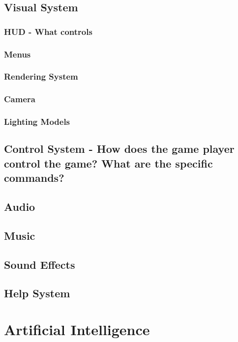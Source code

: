 \documentclass[article, 11pt]{article}
\begin{document}
\subsection{Visual System}
\label{sec:org64cfdb4}
\subsubsection{HUD - What controls}
\label{sec:org4060648}
\subsubsection{Menus}
\label{sec:org0fc22ea}
\subsubsection{Rendering System}
\label{sec:orga9f72cd}
\subsubsection{Camera}
\label{sec:orgdd8c7b1}
\subsubsection{Lighting Models}
\label{sec:orgc630454}
\subsection{Control System - How does the game player control the game? What are the specific commands?}
\label{sec:org1316122}
\subsection{Audio}
\label{sec:org011bcf2}
\subsection{Music}
\label{sec:org32dd5d3}
\subsection{Sound Effects}
\label{sec:orgd37d7da}
\subsection{Help System}
\label{sec:org43da82c}

\section{Artificial Intelligence}
\label{sec:orgf27ac17}
\end{document}
